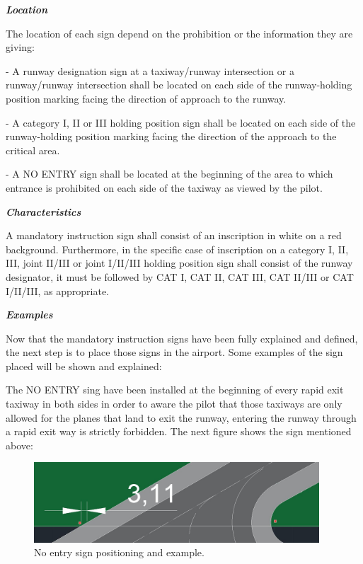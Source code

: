 	\textbf{\textit{Location}}
	
	The location of each sign depend on the prohibition or the information they are giving:
	
	- A runway designation sign at a taxiway/runway intersection or a runway/runway intersection shall be located on each side of the runway-holding position marking facing the direction of approach to the runway.
	
	- A category I, II or III holding position sign shall be located on each side of the runway-holding position marking facing the direction of the approach to the critical area.
	
	- A NO ENTRY sign shall be located at the beginning of the area to which entrance is prohibited on each side of the taxiway as viewed by the pilot.
	
	\textbf{\textit{Characteristics}}
	
	A mandatory instruction sign shall consist of an inscription in white on a red background. Furthermore, in the specific case of inscription on a category I, II, III, joint II/III or joint I/II/III holding position sign shall consist of the runway designator, it must be followed by CAT I, CAT II, CAT III, CAT II/III or CAT I/II/III, as appropriate.
	
	\textbf{\textit{Examples}}
	
	Now that the mandatory instruction signs have been fully explained and defined, the next step is to place those signs in the airport. Some examples of the sign placed will be shown and explained:
	
	The NO ENTRY sing have been installed at the beginning of every rapid exit taxiway in both sides in order to aware the pilot that those taxiways are only allowed for the planes that land to exit the runway, entering the runway through a rapid exit way is strictly forbidden. The next figure shows the sign mentioned above:
	
	\begin{figure}[H]
		\centering
		\includegraphics[clip, trim=0cm 0cm 0cm 0cm, width=0.95\textwidth]{./images/signsexamples/NOentrysign}
		\caption{No entry sign positioning and example.} %
		\label{} %
	\end{figure}
	 
